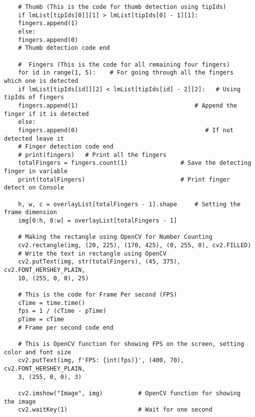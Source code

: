 \begin{verbatim}
	# Thumb (This is the code for thumb detection using tipIds)
	if lmList[tipIds[0]][1] > lmList[tipIds[0] - 1][1]:
	fingers.append(1)
	else:
	fingers.append(0)
	# Thumb detection code end
	
	#  Fingers (This is the code for all remaining four fingers)
	for id in range(1, 5):    # For going through all the fingers which one is detected
	if lmList[tipIds[id]][2] < lmList[tipIds[id] - 2][2]:   # Using tipIds of fingers
	fingers.append(1)                                 # Append the finger if it is detected
	else:
	fingers.append(0)                                    # If not detected leave it
	# Finger detection code end
	# print(fingers)   # Print all the fingers
	totalFingers = fingers.count(1)               # Save the detecting finger in variable
	print(totalFingers)                           # Print finger detect on Console
	
	h, w, c = overlayList[totalFingers - 1].shape     # Setting the frame dimension
	img[0:h, 0:w] = overlayList[totalFingers - 1]
	
	# Making the rectangle using OpenCV for Number Counting
	cv2.rectangle(img, (20, 225), (170, 425), (0, 255, 0), cv2.FILLED)
	# Write the text in rectangle using OpenCV
	cv2.putText(img, str(totalFingers), (45, 375), cv2.FONT_HERSHEY_PLAIN,
	10, (255, 0, 0), 25)
	
	# This is the code for Frame Per second (FPS)
	cTime = time.time()
	fps = 1 / (cTime - pTime)
	pTime = cTime
	# Frame per second code end
	
	# This is OpenCV function for showing FPS on the screen, setting color and font size
	cv2.putText(img, f'FPS: {int(fps)}', (400, 70), cv2.FONT_HERSHEY_PLAIN,
	3, (255, 0, 0), 3)
	
	cv2.imshow("Image", img)          # OpenCV function for showing the image
	cv2.waitKey(1)                    # Wait for one second
\end{verbatim}

